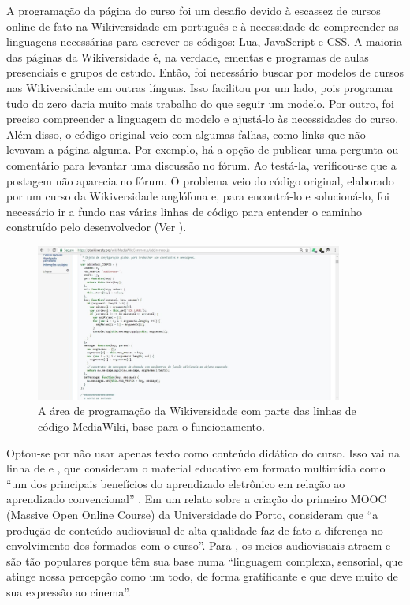 \documentclass{textolivre}
\begin{document}
A programação da página do curso foi um desafio devido à escassez de cursos online de fato na Wikiversidade em português e à necessidade de compreender as linguagens necessárias para escrever os códigos: Lua, JavaScript e CSS. A maioria das páginas da Wikiversidade é, na verdade, ementas e programas de aulas presenciais e grupos de estudo. Então, foi necessário buscar por modelos de cursos nas Wikiversidade em outras línguas. Isso facilitou por um lado, pois programar tudo do zero daria muito mais trabalho do que seguir um modelo. Por outro, foi preciso compreender a linguagem do modelo e ajustá-lo às necessidades do curso. 
Além disso, o código original veio com algumas falhas, como links que não levavam a página alguma. Por exemplo, há a opção de publicar uma pergunta ou comentário para levantar uma discussão no fórum. Ao testá-la, verificou-se que a postagem não aparecia no fórum. O problema veio do código original, elaborado por um curso da Wikiversidade anglófona e, para encontrá-lo e solucioná-lo, foi necessário ir a fundo nas várias linhas de código para entender o caminho construído pelo desenvolvedor (Ver ).

\begin{figure}[htbp]
\centering
\includegraphics[width=0.9\textwidth]{fig03.png}
\caption{A área de programação da Wikiversidade com parte das linhas de código MediaWiki, base para o funcionamento.}
\label{fig03}
\end{figure}

Optou-se por não usar apenas texto como conteúdo didático do curso. Isso vai na linha de \textcite[p. 71]{filatro2008} e \textcite[p. 106]{mattar2014}, que consideram o material educativo em formato multimídia como “um dos principais benefícios do aprendizado eletrônico em relação ao aprendizado convencional” .  
Em um relato sobre a criação do primeiro MOOC (Massive Open Online Course) da Universidade do Porto, \textcite[s.p.]{martins2016} consideram que “a produção de conteúdo audiovisual de alta qualidade faz de fato a diferença no envolvimento dos formados com o curso”. Para \textcite[p. 26]{cruz2008}, os meios audiovisuais atraem e são tão populares porque têm sua base numa “linguagem complexa, sensorial, que atinge nossa percepção como um todo, de forma gratificante e que deve muito de sua expressão ao cinema”.
\end{document}

